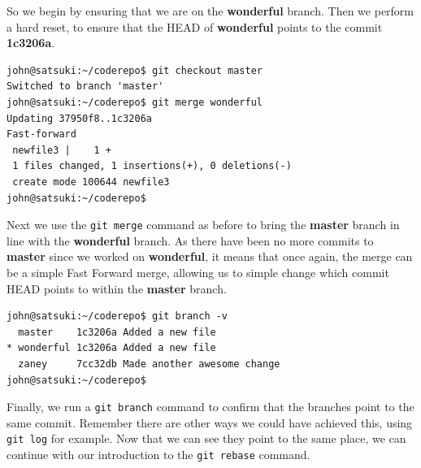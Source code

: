 So we begin by ensuring that we are on the \textbf{wonderful} branch.  Then we perform a hard reset, to ensure that the HEAD of \textbf{wonderful} points to the commit \textbf{1c3206a}.

\begin{Verbatim}
john@satsuki:~/coderepo$ git checkout master
Switched to branch 'master'
john@satsuki:~/coderepo$ git merge wonderful 
Updating 37950f8..1c3206a
Fast-forward
 newfile3 |    1 +
 1 files changed, 1 insertions(+), 0 deletions(-)
 create mode 100644 newfile3
john@satsuki:~/coderepo$
\end{Verbatim}

Next we use the \texttt{git merge} command as before to bring the \textbf{master} branch in line with the \textbf{wonderful} branch.  As there have been no more commits to \textbf{master} since we worked on \textbf{wonderful}, it means that once again, the merge can be a simple Fast Forward merge, allowing us to simple change which commit HEAD points to within the \textbf{master} branch.

\begin{Verbatim} 
john@satsuki:~/coderepo$ git branch -v
  master    1c3206a Added a new file
* wonderful 1c3206a Added a new file
  zaney     7cc32db Made another awesome change
john@satsuki:~/coderepo$ 
\end{Verbatim}

Finally, we run a \texttt{git branch} command to confirm that the branches point to the same commit.  Remember there are other ways we could have achieved this, using \texttt{git log} for example.  Now that we can see they point to the same place, we can continue with our introduction to the \texttt{git rebase} command.


